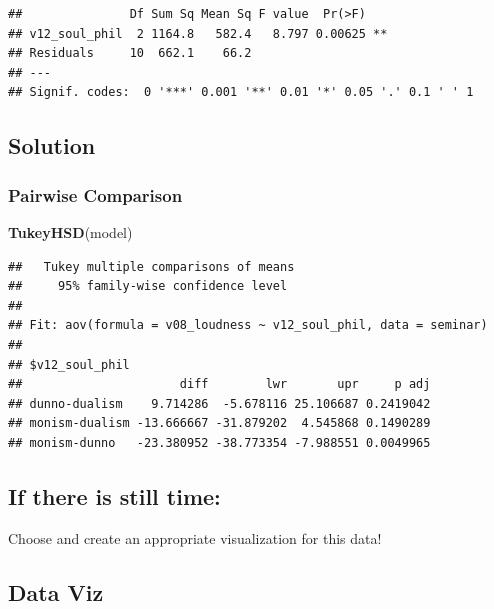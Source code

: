 \documentclass[
]{book}
\newenvironment{Shaded}{\begin{snugshade}}{\end{snugshade}}
\newcommand{\FunctionTok}[1]{\textcolor[rgb]{0.13,0.29,0.53}{\textbf{#1}}}
\newcommand{\NormalTok}[1]{#1}
\begin{document}
\begin{verbatim}
##               Df Sum Sq Mean Sq F value  Pr(>F)   
## v12_soul_phil  2 1164.8   582.4   8.797 0.00625 **
## Residuals     10  662.1    66.2                   
## ---
## Signif. codes:  0 '***' 0.001 '**' 0.01 '*' 0.05 '.' 0.1 ' ' 1
\end{verbatim}

\subsection{\texorpdfstring{Solution }{Solution }}\label{solution-15}

\subsubsection{Pairwise Comparison}\label{pairwise-comparison}

\begin{Shaded}
\begin{Highlighting}[]
\FunctionTok{TukeyHSD}\NormalTok{(model)}
\end{Highlighting}
\end{Shaded}

\begin{verbatim}
##   Tukey multiple comparisons of means
##     95% family-wise confidence level
## 
## Fit: aov(formula = v08_loudness ~ v12_soul_phil, data = seminar)
## 
## $v12_soul_phil
##                      diff        lwr       upr     p adj
## dunno-dualism    9.714286  -5.678116 25.106687 0.2419042
## monism-dualism -13.666667 -31.879202  4.545868 0.1490289
## monism-dunno   -23.380952 -38.773354 -7.988551 0.0049965
\end{verbatim}

\subsection{\texorpdfstring{If there is still time: }{If there is still time: }}\label{if-there-is-still-time}

Choose and create an appropriate visualization for this data!

\subsection{\texorpdfstring{Data Viz }{Data Viz }}\label{data-viz}
\end{document}
